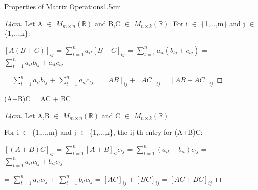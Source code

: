 \begin{ltheorem}{Properties of Matrix Operations}{1.5cm}
            \begin{proof}[14cm]
                Let A $\in$ $M_{m \times n}(\mathbb{R})$ and
                B,C $\in$ $M_{n \times k}(\mathbb{R})$.
                For i $\in$ \{1,...,m\} and j $\in$ \{1,...,k\}:

                \hspace{0.5cm}
                $[A(B+C)]_{ij}$ = $\sum_{t=1}^n a_{it}[B+C]_{tj}$
                = $\sum_{t=1}^n a_{it}(b_{tj}+c_{tj})$
                = $\sum_{t=1}^n a_{it}b_{tj} + a_{it}c_{tj}$

                \hspace{0.5cm}
                = $\sum_{t=1}^n a_{it}b_{tj}$ + $\sum_{t=1}^n a_{it}c_{tj}$
                = $[AB]_{ij} + [AC]_{ij}$
                = $[AB + AC]_{ij}$
            \end{proof}
        
        \item (A+B)C = AC + BC
        
            \begin{proof}[14cm]
                Let A,B $\in$ $M_{m \times n}(\mathbb{R})$ and
                C $\in$ $M_{n \times k}(\mathbb{R})$.
                
                For i $\in$ \{1,...,m\} and j $\in$ \{1,...,k\},
                the ij-th entry for (A+B)C:

                \hspace{0.5cm}
                $[(A+B)C]_{ij}$ = $\sum_{t=1}^n [A+B]_{it}c_{tj}$
                = $\sum_{t=1}^n (a_{it}+b_{it})c_{tj}$
                = $\sum_{t=1}^n a_{it}c_{tj} + b_{it}c_{tj}$

                \hspace{0.5cm}
                = $\sum_{t=1}^n a_{it}c_{tj}$ + $\sum_{t=1}^n b_{it}c_{tj}$
                = $[AC]_{ij} + [BC]_{ij}$
                = $[AC + BC]_{ij}$
            \end{proof}
    \end{ltheorem}

    \vspace{0.5cm}



